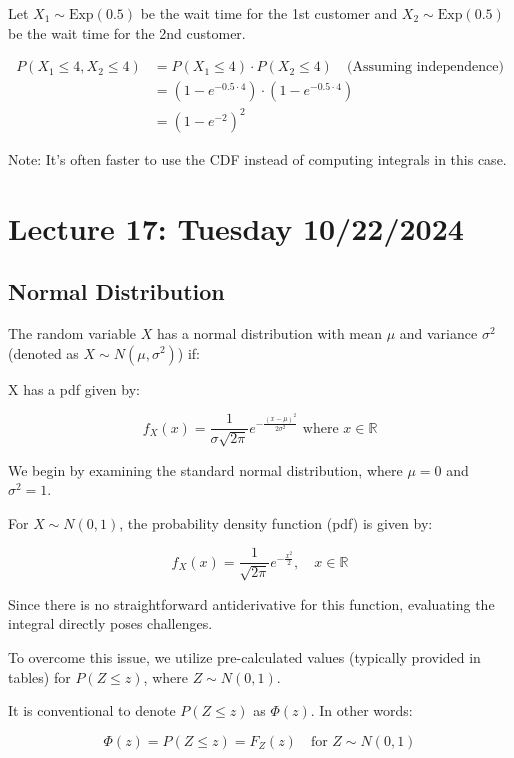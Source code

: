 \documentclass{article}
\begin{document}
    Let $X_1 \sim \text{Exp}(0.5)$ be the wait time for the 1st customer and $X_2 \sim \text{Exp}(0.5)$ be the wait time for the 2nd customer.

    \begin{align*}
    P(X_1 \leq 4, X_2 \leq 4) &= P(X_1 \leq 4) \cdot P(X_2 \leq 4) \quad \text{(Assuming independence)} \\
    &= (1 - e^{-0.5 \cdot 4}) \cdot (1 - e^{-0.5 \cdot 4}) \\
    &= (1 - e^{-2})^2
    \end{align*}

    Note: It's often faster to use the CDF instead of computing integrals in this case.

    \pagebreak

    \section*{Lecture 17: Tuesday 10/22/2024}

    \subsection*{Normal Distribution}

    The random variable $X$ has a normal distribution with mean $\mu$ and variance $\sigma^2$ (denoted as $X \sim N(\mu, \sigma^2)$) if:
    
    X has a pdf given by:

    \[
    f_X(x) = \frac{1}{\sigma \sqrt{2\pi}} e^{-\frac{(x-\mu)^2}{2\sigma^2}} \text{ where } x \in \mathbb{R}
    \]
    

    We begin by examining the standard normal distribution, where $\mu = 0$ and $\sigma^2 = 1$.

    For $X \sim N(0, 1)$, the probability density function (pdf) is given by:

    \[
    f_X(x) = \frac{1}{\sqrt{2\pi}} e^{-\frac{x^2}{2}}, \quad x \in \mathbb{R}
    \]

    Since there is no straightforward antiderivative for this function, evaluating the integral directly poses challenges.

    To overcome this issue, we utilize pre-calculated values (typically provided in tables) for $P(Z \leq z)$, where $Z \sim N(0, 1)$.

    It is conventional to denote $P(Z \leq z)$ as $\Phi(z)$. In other words:

    \[
    \Phi(z) = P(Z \leq z) = F_Z(z) \quad \text{for } Z \sim N(0, 1)
    \]
\end{document}
